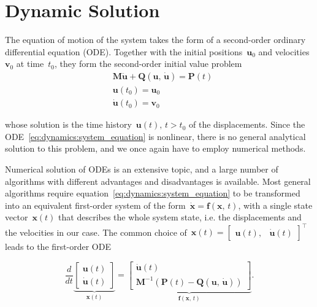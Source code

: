 
\chapter{Dynamic Solution}
\label{chap:dynamic-solution}

The equation of motion of the system takes the form of a second-order ordinary differential equation (ODE).
Together with the initial positions~$\boldsymbol{u}_0$ and velocities~$\mathbf{v}_0$ at time~$t_0$, they form the second-order initial value problem
%
\begin{align}
&\boldsymbol{M}\ddot{\boldsymbol{u}} + \boldsymbol{Q}(\boldsymbol{u},\,\dot{\boldsymbol{u}}) = \boldsymbol{P}(t) \label{eq:dynamics:system_equation} \\
&\boldsymbol{u}(t_0) = \boldsymbol{u}_0 \\
&\dot{\boldsymbol{u}}(t_0) = \mathbf{v}_0
\end{align}

whose solution is the time history~$\boldsymbol{u}(t),\,t > t_0$ of the displacements.
Since the ODE~\eqref{eq:dynamics:system_equation} is nonlinear, there is no general analytical solution to this problem, and we once again have to employ numerical methods.

Numerical solution of ODEs is an extensive topic, and a large number of algorithms with different advantages and disadvantages is available.
Most general algorithms require equation~\eqref{eq:dynamics:system_equation} to be transformed into an equivalent first-order system of the form~$\dot{\boldsymbol{x}} = \boldsymbol{f}(\boldsymbol{x},\,t)$, with a single state vector~$\boldsymbol{x}(t)$ that describes the whole system state, i.e. the displacements and the velocities in our case.
The common choice of~$\boldsymbol{x}(t) = \begin{bmatrix}\boldsymbol{u}(t), & \dot{\boldsymbol{u}}(t)\end{bmatrix}^\intercal$ leads to the first-order ODE

\begin{equation}
\frac{d}{dt}
\underbrace{
\begin{bmatrix}
\boldsymbol{u}(t) \\
\dot{\boldsymbol{u}}(t)
\end{bmatrix}
}_{\boldsymbol{x}(t)}
=
\underbrace{
\begin{bmatrix}
\dot{\boldsymbol{u}}(t) \\
\boldsymbol{M}^{-1}\left(\boldsymbol{P}(t) - \boldsymbol{Q}(\boldsymbol{u},\,\dot{\boldsymbol{u}})\right)
\end{bmatrix}
}_{\boldsymbol{f}(\boldsymbol{x},\,t)}.
\end{equation}

